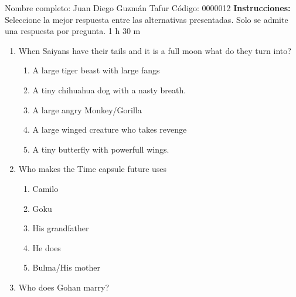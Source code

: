 \documentclass[letterpaper,addpoints,answers,twocolumn,10pt]{exam}
\begin{document}
\noindent Nombre completo: Juan Diego Guzmán Tafur
\newline \newline \newline \newline
Código: 0000012\newline \newline 
{\bf Instrucciones:} Seleccione la mejor respuesta entre las alternativas presentadas. Solo se admite una respuesta por pregunta.
 1 h 30 m

\begin{enumerate}[leftmargin=.2in]




\item  When Saiyans have their tails and it is a full moon what do they turn into?


\begin{enumerate}[noitemsep,leftmargin=0in]


\item  A large tiger beast with large fangs
\item  A tiny chihuahua dog with a nasty breath.
\item  A large angry Monkey/Gorilla
\item  A large winged creature who takes revenge
\item  A tiny butterfly with powerfull wings.


\end{enumerate}



\item  Who makes the Time capsule future uses


\begin{enumerate}[noitemsep,leftmargin=0in]


\item  Camilo
\item  Goku
\item  His grandfather
\item  He does
\item  Bulma/His mother


\end{enumerate}



\item  Who does Gohan marry?


\begin{enumerate}[noitemsep,leftmargin=0in]



\end{enumerate}
\end{enumerate}
\end{document}
